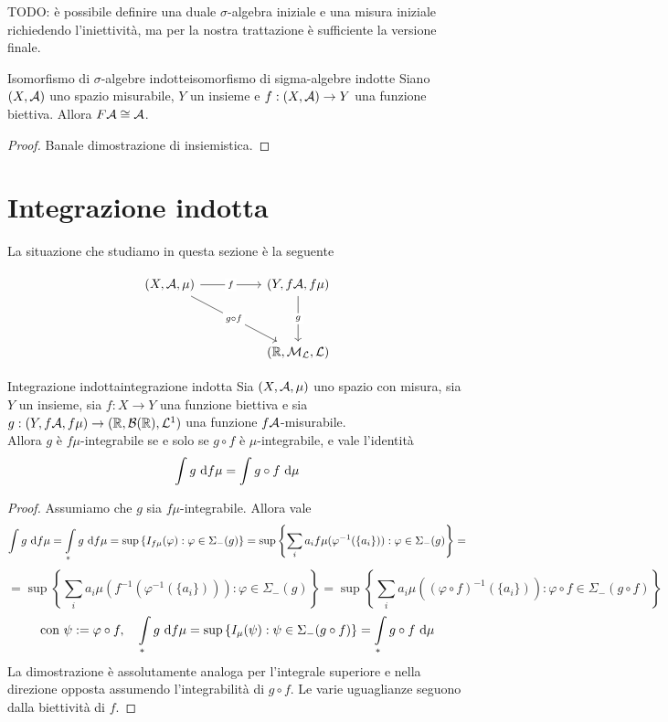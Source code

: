 \documentclass{article}
\begin{document}
TODO: è possibile definire una duale $\sigma$-algebra iniziale e una misura iniziale richiedendo l'iniettività, ma per la nostra trattazione è sufficiente la versione finale.

\begin{lemma}{Isomorfismo di $\sigma$-algebre indotte}{isomorfismo di sigma-algebre indotte}
    Siano $(X,\mathcal{A})$ uno spazio misurabile, $Y$ un insieme e $f: (X,\mathcal{A})\to Y$ una funzione biettiva. Allora $F\mathcal{A} \cong \mathcal{A}$.
    \begin{proof}
        Banale dimostrazione di insiemistica.
    \end{proof}
\end{lemma}

\section{Integrazione indotta}

La situazione che studiamo in questa sezione è la seguente

\[\begin{tikzcd}
	{(X,\mc{A},\mu)} && {(Y,f\mc{A},f\mu)} \\
	\\
	&& {(\R,\M_\L,\L)}
	\arrow["f"{description}, from=1-1, to=1-3]
	\arrow["{g \circ f}"{description}, from=1-1, to=3-3]
	\arrow["g"{description}, from=1-3, to=3-3]
\end{tikzcd}\]

\begin{theorem}{Integrazione indotta}{integrazione indotta}
    Sia $(X,\mathcal{A},\mu)$ uno spazio con misura, sia $Y$ un insieme, sia $f:X\to Y$ una funzione biettiva e sia $g:(Y,f\mathcal{A},f\mu)\to (\mathbb{R},\mathcal{B}(\mathbb{R}),\mathcal{L}^1)$ una funzione $f\mathcal{A}$-misurabile.\\
    Allora $g$ è $f\mu$-integrabile se e solo se $g\circ f$ è $\mu$-integrabile, e vale l'identità
    \[\int\limits g \text{ d} f\mu = \int\limits g\circ f \text{ d} \mu\]
    \begin{proof}
        Assumiamo che $g$ sia $f\mu$-integrabile. Allora vale
        \[\int\limits g \text{ d} f\mu = \int\limits_* g \text{ d} f\mu = \sup\left\{I_{f\mu}(\varphi) : \varphi \in \Sigma_-(g)\right\}=\sup\left\{ \sum_i a_i f\mu(\varphi^{-1}(\{a_i\})) : \varphi \in \Sigma_-(g) \right\} =\]
        \[ = \sup\left\{ \sum_i a_i \mu(f^{-1}(\varphi^{-1}(\{a_i\}))) : \varphi \in \Sigma_-(g) \right\} = \sup\left\{ \sum_i a_i \mu((\varphi \circ f)^{-1}(\{a_i\})) : \varphi \circ f \in \Sigma_-(g\circ f) \right\}\]
        \[\text{con } \psi := \varphi \circ f, \quad \int\limits_* g \text{ d} f\mu =\sup\left\{ I_\mu(\psi) : \psi \in \Sigma_-(g\circ f) \right\} = \int\limits_* g \circ f \text{ d} \mu\]
        La dimostrazione è assolutamente analoga per l'integrale superiore e nella direzione opposta assumendo l'integrabilità di $g\circ f$. Le varie uguaglianze seguono dalla biettività di $f$.
    \end{proof}
\end{theorem}
\end{document}
